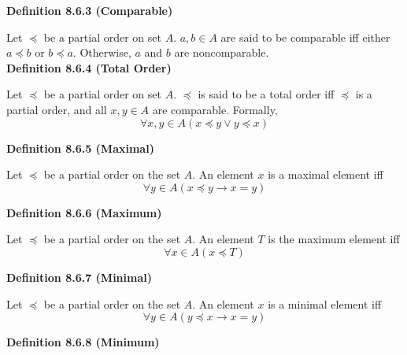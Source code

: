 \documentclass[a4paper]{article}
\makeatletter
\newcommand{\subheading}[1]{{\scriptsize\textbf{#1}}}
\def\tikzscale{1}\begin{lrbox}{\measure@tikzpicture}%
\edef\tikzscale{\pgfmathresult}%
\makeatother
\begin{document}
\begin{multicols*}{4}
\begin{center}
\begin{scaletikzpicturetowidth}{0.8\columnwidth}
\end{scaletikzpicturetowidth}
\end{center}

\subheading{Definition 8.6.3 (Comparable)}

Let $\preceq$ be a partial order on set $A$. $a, b \in A$ are said to be
comparable iff either $a \preceq b$ or $b \preceq a$. Otherwise, $a$ and $b$ are
noncomparable. \\

\subheading{Definition 8.6.4 (Total Order)}

Let $\preceq$ be a partial order on set $A$. $\preceq$ is said to be a total
order iff $\preceq$ is a partial order, and all $x, y \in A$ are comparable.
Formally,
$$\forall x, y \in A(x \preceq y \lor y \preceq x)$$

\subheading{Definition 8.6.5 (Maximal)}

Let $\preceq$ be a partial order on the set $A$. An element $x$ is a maximal
element iff $$\forall y \in A (x \preceq y \rightarrow x = y)$$

\subheading{Definition 8.6.6 (Maximum)}

Let $\preceq$ be a partial order on the set $A$. An element $T$ is the maximum
element iff $$\forall x \in A (x \preceq T)$$

\subheading{Definition 8.6.7 (Minimal)}

Let $\preceq$ be a partial order on the set $A$. An element $x$ is a minimal
element iff $$\forall y \in A (y \preceq x \rightarrow x = y)$$

\subheading{Definition 8.6.8 (Minimum)}


\end{multicols*}
\end{document}
